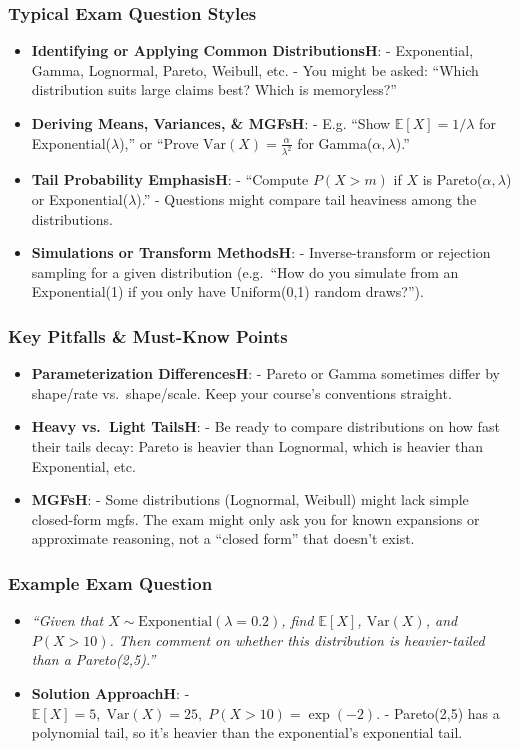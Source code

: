 \documentclass[13pt,a4paper]{article}
\begin{document}
\subsubsection{Typical Exam Question Styles}
\begin{itemize}
  \item \textbf{Identifying or Applying Common DistributionsH}:
    - Exponential, Gamma, Lognormal, Pareto, Weibull, etc.  
    - You might be asked: “Which distribution suits large claims best? Which is memoryless?” 
  \item \textbf{Deriving Means, Variances, \& MGFsH}:
    - E.g. “Show \(\mathbb{E}[X]=1/\lambda\) for Exponential(\(\lambda\)),” or “Prove \(\mathrm{Var}(X)=\frac{\alpha}{\lambda^2}\) for Gamma(\(\alpha,\lambda\)).”
  \item \textbf{Tail Probability EmphasisH}:
    - “Compute \(P(X>m)\) if \(X\) is Pareto(\(\alpha,\lambda\)) or Exponential(\(\lambda\)).”  
    - Questions might compare tail heaviness among the distributions.
  \item \textbf{Simulations or Transform MethodsH}:
    - Inverse-transform or rejection sampling for a given distribution (e.g.\ “How do you simulate from an Exponential(1) if you only have Uniform(0,1) random draws?”).
\end{itemize}

\subsubsection{Key Pitfalls \& Must-Know Points}
\begin{itemize}
  \item \textbf{Parameterization DifferencesH}:
    - Pareto or Gamma sometimes differ by shape/rate vs.\ shape/scale. Keep your course’s conventions straight.
  \item \textbf{Heavy vs.\ Light TailsH}:
    - Be ready to compare distributions on how fast their tails decay: Pareto is heavier than Lognormal, which is heavier than Exponential, etc.
  \item \textbf{MGFsH}:
    - Some distributions (Lognormal, Weibull) might lack simple closed-form mgfs. The exam might only ask you for known expansions or approximate reasoning, not a “closed form” that doesn’t exist.
\end{itemize}

\subsubsection{Example Exam Question}
\begin{itemize}
  \item \emph{“Given that \(X\sim\text{Exponential}(\lambda=0.2)\), find \(\mathbb{E}[X]\), \(\mathrm{Var}(X)\), and \(P(X>10)\). Then comment on whether this distribution is heavier-tailed than a Pareto(2,5).”}
  \item \textbf{Solution ApproachH}: 
    - \(\mathbb{E}[X]=5,\;\mathrm{Var}(X)=25,\;P(X>10)=\exp(-2).\)  
    - Pareto(2,5) has a polynomial tail, so it’s heavier than the exponential’s exponential tail.
\end{itemize}
\end{document}
